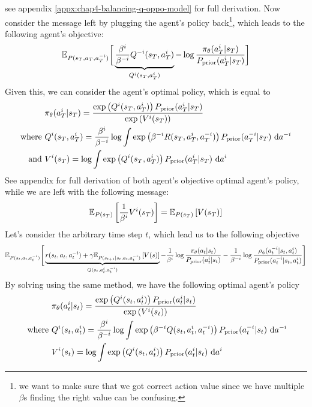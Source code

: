see appendix \ref{appx:chap4-balancing-q-oppo-model} for full derivation. Now consider the message left by plugging the agent's policy back\footnote{we want to make sure that we got correct action value since we have multiple $\beta$s finding the right value can be confusing.}, which leads to the following agent's objective:
\begin{equation}
    \mathbb{E}_{P(s_T, a_T, a^{-i}_T)}\bigg[ \underbrace{\frac{\beta^i}{\beta^{-i}} Q^{-i}(s_T, a^{i}_T)}_{Q^i(s_T, a^{i}_T)} - \log\frac{\pi_{\theta}(a^i_T|s_T)}{P_{\text{prior}}(a^i_T|s_T)}\bigg]
\end{equation}
Given this, we can consider the agent's optimal policy, which is equal to 
\begin{equation}
\begin{aligned}
    &\pi_{\theta}(a^i_T|s_T) = \frac{ \exp\left( Q^i(s_T, a^{i}_T) \right)P_{\text{prior}}(a^i_T|s_T)} {\exp\left( V^i(s_T) \right)} \\
    \text{where }& Q^i(s_T, a^{i}_T) = \frac{\beta^i}{\beta^{-i}} \log \int \exp\left( \beta^{-i} R(s_T, a^i_T, a^{-i}_T) \right) P_{\text{prior}}(a^{-i}_T|s_T) \ \mathrm{d} a^{-i} \\
    \text{and }& V^i(s_T) = \log \int  \exp\left( Q^i(s_T, a^{i}_T) \right)P_{\text{prior}}(a^i_T|s_T) \ \mathrm{d} a^i
\end{aligned}
\end{equation}
See appendix for full derivation of both agent's objective optimal agent's policy, while we are left with the following message:
\begin{equation}
    \mathbb{E}_{P(s_T)}\left[ \frac{1}{\beta^i}V^i(s_T) \right] = \mathbb{E}_{P(s_T)}\left[ V(s_T) \right]
\end{equation}
Let's consider the arbitrary time step $t$, which lead us to the following objective 
\begin{equation}
    \mathbb{E}_{P(s_t, a_t, a^{-i}_t)}\Bigg[ \underbrace{r(s_t, a_t, a^{-i}_t) + \gamma\mathbb{E}_{P(s_{t+1} | s_t, a_t, a^{-i}_t)}\left[ V(s) \right]}_{Q(s_t, a^i_t, a^{-i}_t)} - \frac{1}{\beta^i} \log\frac{\pi_{\theta}(a_t|s_t)}{P_{\text{prior}}(a^i_t|s_t)} - \frac{1}{\beta^{-i}}\log \frac{\rho_\phi(a^{-i}_t | s_t, a^i_t)}{P_{\text{prior}}(a^{-i}_t | s_t, a^i_t)} \Bigg]
\end{equation}
By solving using the same method, we have the following optimal agent's policy
\begin{equation}
\begin{aligned}
    &\pi_{\theta}(a^i_t|s_t) = \frac{ \exp\left( Q^i(s_t, a^{i}_t) \right)P_{\text{prior}}(a^i_t|s_t)} {\exp\left( V^i(s_t) \right)} \\
    \text{ where }
    &Q^{i}(s_t, a^{i}_t) = \frac{\beta^i}{\beta^{-i}} \log \int \exp\left( \beta^{-i} Q(s_t, a^i_t, a^{-i}_t) \right) P_{\text{prior}}(a^{-i}_t|s_t) \ \mathrm{d} a^{-i} \\
    &V^{i}(s_t) = \log \int  \exp\left( Q^i(s_t, a^{i}_t) \right)P_{\text{prior}}(a^i_t|s_t) \ \mathrm{d} a^i\\
\end{aligned}
\end{equation}
